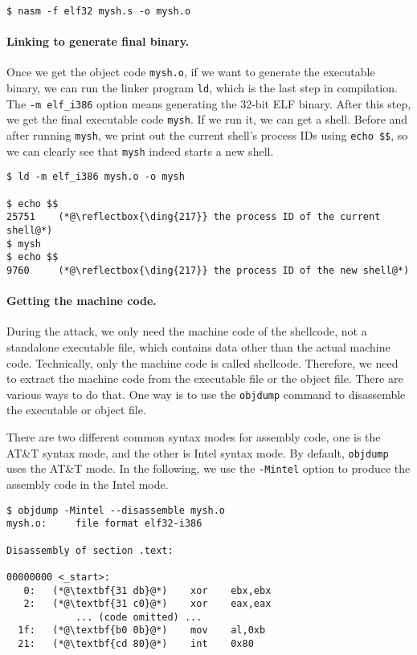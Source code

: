 \begin{lstlisting}
$ nasm -f elf32 mysh.s -o mysh.o
\end{lstlisting}


\paragraph{Linking to generate final binary.}
Once we get the object code \texttt{mysh.o}, if we want to generate the 
executable binary, we can run the linker program \texttt{ld}, which
is the last step in compilation. The \texttt{-m elf\_i386} option means 
generating the 32-bit ELF binary. 
After this step, we get the final
executable code \texttt{mysh}. If we run it, we can get a shell. 
Before and after running \texttt{mysh},  
we print out the current shell's process IDs using \texttt{echo \$\$},
so we can clearly see that \texttt{mysh} indeed starts a new shell. 

\begin{lstlisting}
$ ld -m elf_i386 mysh.o -o mysh

$ echo $$
25751    (*@\reflectbox{\ding{217}} the process ID of the current shell@*)
$ mysh
$ echo $$
9760     (*@\reflectbox{\ding{217}} the process ID of the new shell@*)
\end{lstlisting}



\paragraph{Getting the machine code.}
During the attack, we only need the machine code 
of the shellcode, not a standalone executable file, which
contains data other than the actual machine code. 
Technically, only the machine code is called shellcode. 
Therefore, we need to extract the machine
code from the executable file or the object file.
There are various ways to do that. One way is to 
use the \texttt{objdump} command to disassemble the 
executable or object file. 

There are two different common syntax modes for assembly code, 
one is the AT\&T syntax mode, and the other is 
Intel syntax mode. By default, \texttt{objdump} uses
the AT\&T mode. In the following, 
we use the \texttt{-Mintel} option to 
produce the assembly code in the Intel mode. 

\begin{lstlisting}
$ objdump -Mintel --disassemble mysh.o
mysh.o:     file format elf32-i386

Disassembly of section .text:

00000000 <_start>:
   0:	(*@\textbf{31 db}@*)    xor    ebx,ebx
   2:	(*@\textbf{31 c0}@*)    xor    eax,eax
            ... (code omitted) ...
  1f:	(*@\textbf{b0 0b}@*)    mov    al,0xb
  21:	(*@\textbf{cd 80}@*)    int    0x80
\end{lstlisting}
 
